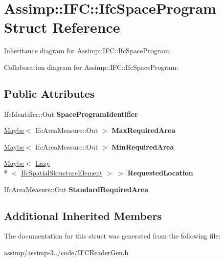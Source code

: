\hypertarget{struct_assimp_1_1_i_f_c_1_1_ifc_space_program}{\section{Assimp\+:\+:I\+F\+C\+:\+:Ifc\+Space\+Program Struct Reference}
\label{struct_assimp_1_1_i_f_c_1_1_ifc_space_program}
}


Inheritance diagram for Assimp\+:\+:I\+F\+C\+:\+:Ifc\+Space\+Program\+:


Collaboration diagram for Assimp\+:\+:I\+F\+C\+:\+:Ifc\+Space\+Program\+:
\subsection*{Public Attributes}
\begin{DoxyCompactItemize}
\item 
\hypertarget{struct_assimp_1_1_i_f_c_1_1_ifc_space_program_a13ac83faab706a5be0d53d34d211db79}{Ifc\+Identifier\+::\+Out {\bfseries Space\+Program\+Identifier}}\label{struct_assimp_1_1_i_f_c_1_1_ifc_space_program_a13ac83faab706a5be0d53d34d211db79}

\item 
\hypertarget{struct_assimp_1_1_i_f_c_1_1_ifc_space_program_ac78465352be854d531edcb35455da392}{\hyperlink{struct_assimp_1_1_s_t_e_p_1_1_maybe}{Maybe}$<$ Ifc\+Area\+Measure\+::\+Out $>$ {\bfseries Max\+Required\+Area}}\label{struct_assimp_1_1_i_f_c_1_1_ifc_space_program_ac78465352be854d531edcb35455da392}

\item 
\hypertarget{struct_assimp_1_1_i_f_c_1_1_ifc_space_program_a6be23685076edd409c552e19635a92b0}{\hyperlink{struct_assimp_1_1_s_t_e_p_1_1_maybe}{Maybe}$<$ Ifc\+Area\+Measure\+::\+Out $>$ {\bfseries Min\+Required\+Area}}\label{struct_assimp_1_1_i_f_c_1_1_ifc_space_program_a6be23685076edd409c552e19635a92b0}

\item 
\hypertarget{struct_assimp_1_1_i_f_c_1_1_ifc_space_program_aa60c5c40ca321e4145af410ac0031818}{\hyperlink{struct_assimp_1_1_s_t_e_p_1_1_maybe}{Maybe}$<$ \hyperlink{struct_assimp_1_1_s_t_e_p_1_1_lazy}{Lazy}\\*
$<$ \hyperlink{struct_assimp_1_1_i_f_c_1_1_ifc_spatial_structure_element}{Ifc\+Spatial\+Structure\+Element} $>$ $>$ {\bfseries Requested\+Location}}\label{struct_assimp_1_1_i_f_c_1_1_ifc_space_program_aa60c5c40ca321e4145af410ac0031818}

\item 
\hypertarget{struct_assimp_1_1_i_f_c_1_1_ifc_space_program_a68ff8752c51e4af0bd6fe74cf98d497d}{Ifc\+Area\+Measure\+::\+Out {\bfseries Standard\+Required\+Area}}\label{struct_assimp_1_1_i_f_c_1_1_ifc_space_program_a68ff8752c51e4af0bd6fe74cf98d497d}

\end{DoxyCompactItemize}
\subsection*{Additional Inherited Members}


The documentation for this struct was generated from the following file\+:\begin{DoxyCompactItemize}
\item 
assimp/assimp-\/3../code/I\+F\+C\+Reader\+Gen.\+h\end{DoxyCompactItemize}
